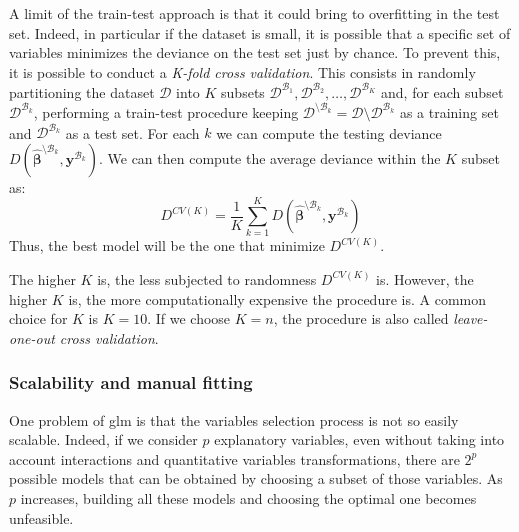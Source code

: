 \documentclass[a4paper, twoside, openright, 12pt]{report}
\theoremstyle{definition}
\theoremstyle{definition}
\theoremstyle{definition}
\theoremstyle{remark}
\begin{document}
A limit of the train-test approach is that it could bring to overfitting in the test set. Indeed, in particular if the dataset is small, it is possible that a specific set of variables minimizes the deviance on the test set just by chance. To prevent this, it is possible to conduct a \emph{K-fold cross validation}. This consists in randomly partitioning the dataset \(\mathcal{D}\) into \(K\) subsets \(\mathcal{D}^{\mathcal{B}_1}, \mathcal{D}^{\mathcal{B}_2}, \dots, \mathcal{D}^{\mathcal{B}_K}\) and, for each subset \(\mathcal{D}^{\mathcal{B}_k}\), performing a train-test procedure keeping \(\mathcal{D}^{\setminus \mathcal{B}_k} = \mathcal{D} \setminus \mathcal{D}^{\mathcal{B}_k}\) as a training set and \(\mathcal{D}^{\mathcal{B}_k}\) as a test set. For each \(k\) we can compute the testing deviance \(D\left( \hat{\boldsymbol{\beta}}^{\setminus \mathcal{B}_k}, \boldsymbol{y}^{\mathcal{B}_k} \right)\). We can then compute the average deviance within the \(K\) subset as:
\[
D^{CV(K)} = \frac{1}{K} \sum_{k=1}^{K}{D\left( \hat{\boldsymbol{\beta}}^{\setminus \mathcal{B}_k}, \boldsymbol{y}^{\mathcal{B}_k} \right)}
\]
Thus, the best model will be the one that minimize \(D^{CV(K)}\).

The higher \(K\) is, the less subjected to randomness \(D^{CV(K)}\) is. However, the higher \(K\) is, the more computationally expensive the procedure is. A common choice for \(K\) is \(K=10\). If we choose \(K=n\), the procedure is also called \emph{leave-one-out cross validation}.

\hypertarget{scalability-and-manual-fitting}{%
\subsubsection{Scalability and manual fitting}\label{scalability-and-manual-fitting}}

One problem of \ac{glm} is that the variables selection process is not so easily scalable. Indeed, if we consider \(p\) explanatory variables, even without taking into account interactions and quantitative variables transformations, there are \(2^p\) possible models that can be obtained by choosing a subset of those variables. As \(p\) increases, building all these models and choosing the optimal one becomes unfeasible.
\end{document}
